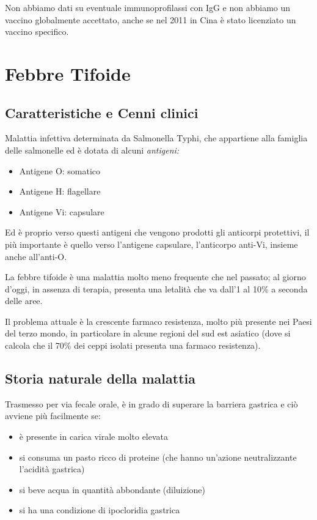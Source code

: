 Non abbiamo dati su eventuale immunoprofilassi con IgG e non abbiamo un
vaccino globalmente accettato, anche se nel 2011 in Cina è stato
licenziato un vaccino specifico.
\section{Febbre Tifoide}

\subsection{Caratteristiche e Cenni clinici}


Malattia infettiva determinata da Salmonella Typhi, che appartiene alla
famiglia delle salmonelle ed è dotata di alcuni \emph{antigeni:}

\begin{itemize}
\item
  Antigene O: somatico
\item
  Antigene H: flagellare
\item
  Antigene Vi: capsulare
\end{itemize}

Ed è proprio verso questi antigeni che vengono prodotti gli anticorpi
protettivi, il più importante è quello verso l'antigene capsulare,
l'anticorpo anti-Vi, insieme anche all'anti-O.

La febbre tifoide è una malattia molto meno frequente che nel passato;
al giorno d'oggi, in assenza di terapia, presenta una letalità che va
dall'1 al 10\% a seconda delle aree.

Il problema attuale è la crescente farmaco resistenza, molto più
presente nei Paesi del terzo mondo, in particolare in alcune regioni del
sud est asiatico (dove si calcola che il 70\% dei ceppi isolati presenta
una farmaco resistenza).

\subsection{Storia naturale della malattia }

Trasmesso per via fecale orale, è in grado di superare la barriera
gastrica e ciò avviene più facilmente se:

\begin{itemize}
\item
  è presente in carica virale molto elevata
\item
  si consuma un pasto ricco di proteine (che hanno un'azione
  neutralizzante l'acidità gastrica)
\item
  si beve acqua in quantità abbondante (diluizione)
\item
  si ha una condizione di ipocloridia gastrica
\end{itemize}

